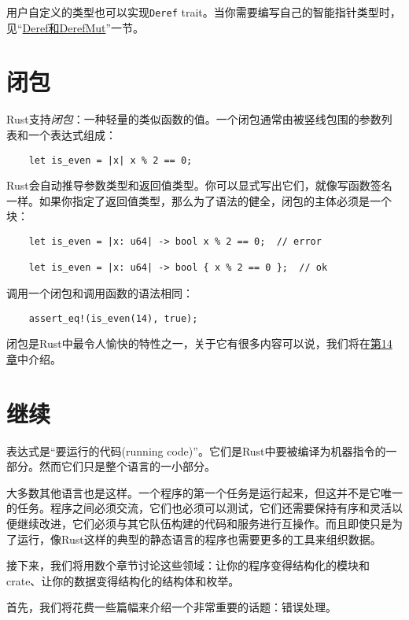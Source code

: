 用户自定义的类型也可以实现\texttt{Deref} trait。当你需要编写自己的智能指针类型时，见“\hyperref[deref]{Deref和DerefMut}”一节。

\section{闭包}
Rust支持\emph{闭包}：一种轻量的类似函数的值。一个闭包通常由被竖线包围的参数列表和一个表达式组成：
\begin{verbatim}
    let is_even = |x| x % 2 == 0;
\end{verbatim}

Rust会自动推导参数类型和返回值类型。你可以显式写出它们，就像写函数签名一样。如果你指定了返回值类型，那么为了语法的健全，闭包的主体必须是一个块：
\begin{verbatim}
    let is_even = |x: u64| -> bool x % 2 == 0;  // error
    
    let is_even = |x: u64| -> bool { x % 2 == 0 };  // ok
\end{verbatim}

调用一个闭包和调用函数的语法相同：
\begin{verbatim}
    assert_eq!(is_even(14), true);
\end{verbatim}

闭包是Rust中最令人愉快的特性之一，关于它有很多内容可以说，我们将在\hyperref[ch14]{第14章}中介绍。

\section{继续}

表达式是“要运行的代码(running code)”。它们是Rust中要被编译为机器指令的一部分。然而它们只是整个语言的一小部分。

大多数其他语言也是这样。一个程序的第一个任务是运行起来，但这并不是它唯一的任务。程序之间必须交流，它们也必须可以测试，它们还需要保持有序和灵活以便继续改进，它们必须与其它队伍构建的代码和服务进行互操作。而且即使只是为了运行，像Rust这样的典型的静态语言的程序也需要更多的工具来组织数据。

接下来，我们将用数个章节讨论这些领域：让你的程序变得结构化的模块和crate、让你的数据变得结构化的结构体和枚举。

首先，我们将花费一些篇幅来介绍一个非常重要的话题：错误处理。
